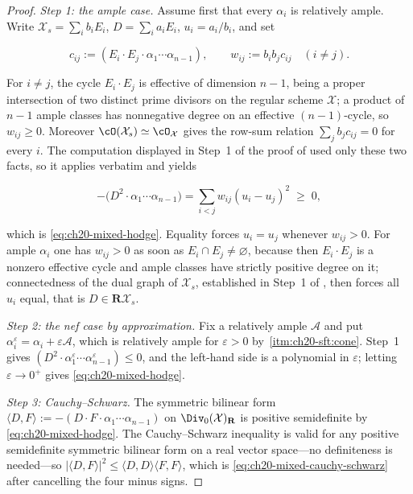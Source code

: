 \begin{proof}
\emph{Step 1: the ample case.}  Assume first that every \(\alpha_i\) is
relatively ample.  Write \(\mathcal X_s=\sum_ib_iE_i\), \(D=\sum_ia_iE_i\),
\(u_i=a_i/b_i\), and set

\[
 c_{ij}:=(E_i\cdot E_j\cdot\alpha_1\cdots\alpha_{n-1}),
 \qquad
 w_{ij}:=b_ib_jc_{ij}\quad(i\ne j).
\]

For \(i\ne j\), the cycle \(E_i\cdot E_j\) is effective of dimension
\(n-1\), being a proper intersection of two distinct prime divisors on the
regular scheme \(\mathcal X\); a product of \(n-1\) ample classes has
nonnegative degree on an effective \((n-1)\)-cycle, so \(w_{ij}\geq0\).
Moreover \(\cO(\mathcal X_s)\simeq\cO_{\mathcal X}\) gives the row-sum
relation \(\sum_jb_jc_{ij}=0\) for every \(i\).  The computation displayed
in Step~1 of the proof of  used only these two
facts, so it applies verbatim and yields

\begin{equation}
\label{eq:ch20-mixed-hodge-laplacian}
 -\bigl(D^2\cdot\alpha_1\cdots\alpha_{n-1}\bigr)
 =\sum_{i<j}w_{ij}(u_i-u_j)^2\;\geq\;0,
\end{equation}

which is \eqref{eq:ch20-mixed-hodge}.  Equality forces \(u_i=u_j\) whenever
\(w_{ij}>0\).  For ample \(\alpha_i\) one has \(w_{ij}>0\) as soon as
\(E_i\cap E_j\neq\varnothing\), because then \(E_i\cdot E_j\) is a nonzero
effective cycle and ample classes have strictly positive degree on it;
connectedness of the dual graph of \(\mathcal X_s\), established in Step~1 of
, then forces all \(u_i\) equal, that is
\(D\in\mathbf R\mathcal X_s\).

\emph{Step 2: the nef case by approximation.}  Fix a relatively ample
\(\mathcal A\) and put \(\alpha_i^\varepsilon=\alpha_i+\varepsilon\mathcal A\),
which is relatively ample for \(\varepsilon>0\) by
\,\cref{itm:ch20-sft:cone}.  Step~1 gives
\((D^2\cdot\alpha_1^\varepsilon\cdots\alpha_{n-1}^\varepsilon)\leq0\), and
the left-hand side is a polynomial in \(\varepsilon\); letting
\(\varepsilon\to0^+\) gives \eqref{eq:ch20-mixed-hodge}.

\emph{Step 3: Cauchy--Schwarz.}  The symmetric bilinear form
\(\langle D,F\rangle:=-(D\cdot F\cdot\alpha_1\cdots\alpha_{n-1})\) on
\(\Div_0(\mathcal X)_{\mathbf R}\) is positive semidefinite by
\eqref{eq:ch20-mixed-hodge}.  The Cauchy--Schwarz inequality is valid for
any positive semidefinite symmetric bilinear form on a real vector space---no
definiteness is needed---so
\(|\langle D,F\rangle|^2\leq\langle D,D\rangle\langle F,F\rangle\), which is
\eqref{eq:ch20-mixed-cauchy-schwarz} after cancelling the four minus signs.
\end{proof}

